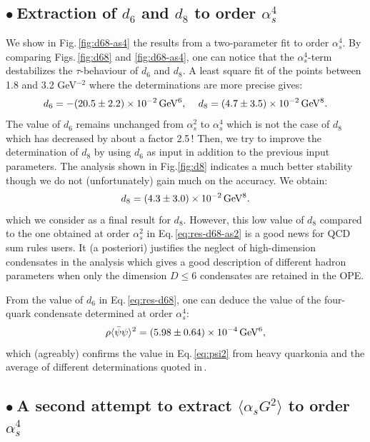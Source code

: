\documentclass[review]{elsarticle}
\def\beq{\begin{equation}}
\def\eeq{\end{equation}}
\def\la{\langle}
\def\ra{\rangle}
\def\b{$\bullet~$}
\begin{document}
\subsection*{ \b Extraction of $d_6$ and $d_8$ to order $\alpha_s^4$}
 We show in Fig.\,\ref{fig:d68-as4} the results from a two-parameter fit to order $\alpha_s^4$. By comparing Figs.\,\ref{fig:d68} and \ref{fig:d68-as4}, one can notice that the $\alpha_s^4$-term destabilizes the $\tau$-behaviour of $d_6$ and $d_8$.  A least square fit of the points between 1.8 and 3.2 GeV$^{-2}$ where the determinations are more precise gives:
\beq
d_6 =  -(20.5\pm2.2)\times 10^{-2}\,{\rm GeV^6},\,\,\,\,\,\,\, d_8= (4.7\pm 3.5)\times 10^{-2}\,{\rm GeV^8}.
\label{eq:res-d68}
\eeq 
The value of $d_6$ remains unchanged from $\alpha_s^2$ to $\alpha_s^4$ which is not the case of $d_8$ which has decreased by about a factor 2.5\,! Then, we try to improve the determination of $d_8$ by using $d_6$ as input in addition to the previous input parameters. The analysis shown in Fig.\ref{fig:d8} indicates a much better stability though we do not (unfortunately) gain much on the accuracy. We obtain:
\beq
d_8= (4.3\pm 3.0)\times 10^{-2}\,{\rm GeV^8}.
\label{eq:d8-res}
\eeq
which we consider as a final result for $d_8$. However, this low value of $d_8$ compared to the one obtained at order $\alpha_s^2$ in Eq.\,\ref{eq:res-d68-as2} is a good news for QCD sum rules users. It (a posteriori) justifies the neglect of high-dimension condensates in the analysis which gives a good description of different hadron parameters when only the dimension $D\leq 6$ condensates are retained in the OPE. 

From the value of $d_6$ in Eq.\,\ref{eq:res-d68}, one can deduce the value of  the four-quark condensate determined at order $\alpha_s^4$:
\beq
 \rho\la\bar\psi\psi\ra^2=(5.98\pm 0.64)\times 10^{-4}\,{\rm GeV^6},
 \label{eq:res-4q}
 \eeq
 which (agreably) confirms the value in Eq.\,\ref{eq:psi2} from heavy quarkonia and the average of different determinations quoted in\,\cite{SNparam}. 
\subsection*{ \b  A second attempt to extract $\la\alpha_s G^2\ra$ to order $\alpha_s^4$ }
\end{document}
